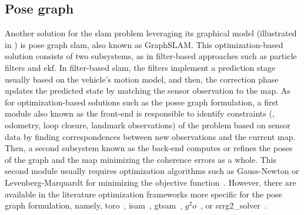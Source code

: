 \subsection{Pose graph}\label{sec:literature:slam:graph}
Another solution for the \gls{slam} problem leveraging its graphical model
(illustrated in ) is pose graph \gls{slam},
also known as GraphSLAM. This optimization-based solution consists of two
subsystems, as in filter-based approaches such as particle filters and \gls{ekf}.
In filter-based \gls{slam}, the filters implement a prediction stage
usually based on the vehicle's motion model, and then,
the correction phase updates the predicted state
by matching the sensor observation to the map.
As for optimization-based solutions such as the posse graph formulation,
a first module also known as the front-end is responsible to identify
constraints (\eg, odometry, loop closure, landmark observations)
of the problem based on sensor data by finding correspondences
between new observations and the current map.
Then, a second subsystem known as the back-end computes or refines
the poses of the graph and the map minimizing the coherence errors as a whole.
This second module usually requires optimization algorithms such as
Gauss-Newton or Levenberg-Marquardt for minimizing the objective
function~\cite{bresson:tiv:2017}. However, there are available in the literature
optimization frameworks more specific for the pose graph formulation, namely,
\gls{toro}~\cite{grisetti:tits:2009},
\gls{isam}~\cite{kaess:tro:2008,kaess:icra:2011},
\gls{gtsam}~\cite{dellaert:tech:2012,dellaert-kaess:ftr:2017},
$g^2o$~\cite{kummerle:icra:2011}, or
srrg2\_solver~\cite{grisetti:robotics:2020}.

